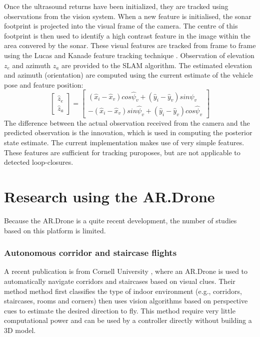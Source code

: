 Once the ultrasound returns have been initialized, they are tracked using observations from the vision system.
When a new feature is initialised, the sonar footprint is projected into the visual frame of the camera.
The centre of this footprint is then used to identify a high contrast feature in the image within the area convered by the sonar.
These visual features are tracked from frame to frame using the Lucas and Kanade feature tracking technique \cite{lucas1998application}.
Observation of elevation $z_e$ and azimuth $z_a$ are provided to the SLAM algorithm.
The estimated elevation and azimuth (orientation) are computed using the current estimate of the vehicle pose and feature position:
\begin{equation}
\left[ {
\begin{array}{c} \hat{z}_e \\ \hat{z}_a \end{array}
} \right] =
\left[ {
\begin{array}{c}
	(\hat{x}_i - \hat{x}_v) cos \hat{\psi}_v + (\hat{y}_i - \hat{y}_v) sin \hat{\psi}_v \\
	-(\hat{x}_i - \hat{x}_v) sin \hat{\psi}_v + (\hat{y}_i - \hat{y}_v) cos \hat{\psi}_v
\end{array}
} \right]
\end{equation}
The difference between the actual observation received from the camera and the predicted observation is the innovation, which is used in computing the posterior state estimate.
The current implementation makes use of very simple features.
These features are sufficient for tracking puroposes, but are not applicable to detected loop-closures.


\section{Research using the AR.Drone}
Because the AR.Drone is a quite recent development, the number of studies based on this platform is limited.

\subsubsection{Autonomous corridor and staircase flights}

A recent publication is from Cornell University \cite{Bills2011icra}, where an AR.Drone is used to automatically navigate corridors and staircases based on visual clues.
Their method method first classifies the type of indoor environment (e.g., corridors, staircases, rooms and corners) then uses vision algorithms based on perspective cues to estimate the desired direction to fly.
This method require very little computational power and can be used by a controller directly without building a 3D model.

